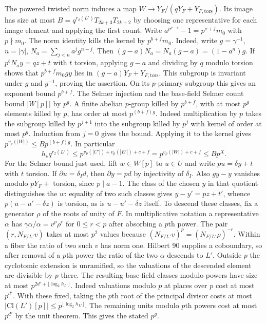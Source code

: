 The powered twisted norm induces a map
$W\to Y_F/(qY_F+Y_{F,\mathrm{tors}})$. Its image has size at most
$B=q^{r_2(L')}T_{2k+3}T_{2k+2}$ by choosing one representative for
each image element and applying the first count. Write
$a^{p^{\nu-c}}-1=p^{\nu+f}m_0$ with $p\nmid m_0$.
The norm identity kills the kernel by $p^{b+f}m_0$.
Indeed, write $g=\gamma^{-1}$, $n=|\gamma|$, $N_a=\sum_{j<n}a^jg^{n-j}$.
Then $(g-a)N_a=N_a(g-a)=(1-a^n)g$. If $p^bN_a y=qz+t$
with $t$ torsion, applying $g-a$ and dividing by $q$ modulo torsion
shows that $p^{b+f}m_0g y$ lies in $(g-a)Y_F+Y_{F,\mathrm{tors}}$.
This subgroup is invariant under $g$ and $g^{-1}$, proving the assertion.
On its $p$-primary subgroup this gives an exponent bound $p^{b+f}$.
The Selmer injection and the base-field Selmer count bound $|W[p]|$
by $p^g$. A finite abelian $p$-group killed by $p^{b+f}$, with
at most $p^g$ elements killed by $p$, has order at most $p^{(b+f)g}$.
Indeed multiplication by $p$ takes the subgroup killed by $p^{j+1}$
into the subgroup killed by $p^j$ with kernel of order at most $p^g$.
Induction from $j=0$ gives the bound. Applying it to the kernel gives
$p^{v_p(|W|)}\le Bp^{(b+f)g}$. In particular
\[
 h_\nu q^{r_2(L')}\le
 p^{v_p(|C'|)+v_p(|E'|)+c+f}
 =p^{v_p(|W|)+c+f}\le Bp^X.
\]
For the Selmer bound just used, lift $w\in W[p]$ to $u\in U$ and write
$pu=\delta y+t$ with $t$ torsion. If $\partial u=\delta_I d$, then
$\partial y=pd$ by injectivity of $\delta_I$. Also $gy-y$ vanishes
modulo $pY_F+$ torsion, since $p\mid a-1$. The class of the chosen
$y$ in that quotient distinguishes the $w$: equality of two such
classes gives $y-y'=pz+t'$, whence
$p(u-u'-\delta z)$ is torsion, as is $u-u'-\delta z$ itself.
To descend these classes, fix a generator $\rho$ of the roots of unity
of $F$. In multiplicative notation a representative $\alpha$ has
$\gamma\alpha/\alpha=v^p\rho^r$ for $0\le r<p$ after absorbing a
$p$th power. The pair $(r,N_{F/L'}v)$ takes at most $p^2$ values
because $(N_{F/L'}v)^p=(N_{F/L'}\rho)^{-r}$. Within a fiber the ratio
of two such $v$ has norm one. Hilbert 90 supplies a coboundary, so
after removal of a $p$th power the ratio of the two $\alpha$ descends
to $L'$. Outside $p$ the cyclotomic extension is unramified, so the
valuations of the descended element are divisible by $p$ there.
The resulting base-field classes modulo powers have size at most
$p^{2d'+\lfloor\log_2 h_{L'}\rfloor}$. Indeed valuations modulo $p$
at places over $p$ cost at most $p^{d'}$. With these fixed, taking
the $p$th root of the principal divisor costs at most
$|\mathrm{Cl}(L')[p]|\le p^{\lfloor\log_2 h_{L'}\rfloor}$.
The remaining units modulo $p$th powers cost at most $p^{d'}$
by the unit theorem. This gives the stated $p^g$.


